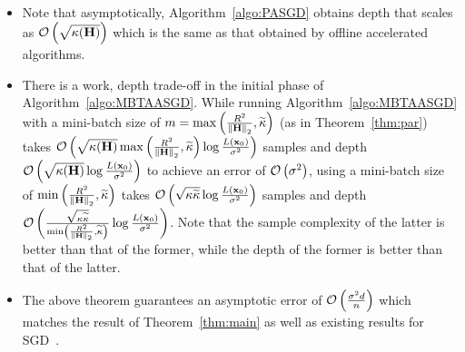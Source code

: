 \begin{itemize}
	\item	Note that asymptotically, Algorithm~\ref{algo:PASGD} obtains depth that scales as $\order{\sqrt{\kappa(\Cov)}}$ which is the same as that obtained by offline accelerated algorithms.
	\item	There is a work, depth trade-off in the initial phase of Algorithm~\ref{algo:MBTAASGD}. While running Algorithm~\ref{algo:MBTAASGD} with a mini-batch size of $m = \max\left(\frac{R^2}{\twonorm{\Cov}},{\cnS}\right)$ (as in Theorem~\ref{thm:par}) takes $\order{\sqrt{\kappa(\Cov)} \max\left(\frac{R^2}{\twonorm{\Cov}},{\cnS}\right) \log \frac{L(\xt[0])}{\sigma^2}}$ samples and depth $\order{\sqrt{\kappa(\Cov)} \log \frac{L(\xt[0])}{\sigma^2 }}$ to achieve an error of $\order{\sigma^2}$, using a mini-batch size of $\min\left(\frac{R^2}{\twonorm{\Cov}},{\cnS}\right)$ takes $\order{\sqrt{\cnH\cnS}\log \frac{L(\xt[0])}{\sigma^2}}$ samples and depth $\order{\frac{\sqrt{\cnH\cnS}}{\min\left(\frac{R^2}{\twonorm{\Cov}},{\cnS}\right)}\log \frac{L(\xt[0])}{\sigma^2}}$. Note that the sample complexity of the latter is better than that of the former, while the depth of the former is better than that of the latter.
	\item	The above theorem guarantees an asymptotic error of $\order{\frac{\sigma^2 d}{n}}$ which matches the result of Theorem~\ref{thm:main} as well as existing results for SGD~\cite{DefossezB15,JainKKNS16}.
\end{itemize}
\fi